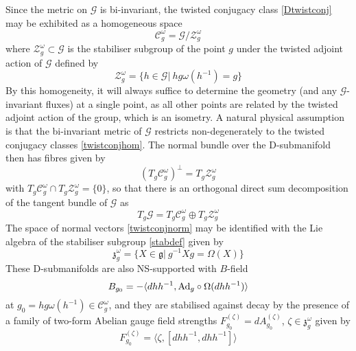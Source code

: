Since the metric on $\mathcal{G}$ is bi-invariant, the twisted conjugacy class
\eqref{Dtwistconj} may be exhibited as a homogeneous space
\begin{equation}
  \label{twistconjhom}
  {\mathcal C}_g^\omega=\mathcal{G}/{\mathcal Z}_g^\omega
\end{equation}
where ${\mathcal Z}_g^\omega\subset \mathcal{G}$ is the stabiliser subgroup of
the point $g$ under the twisted adjoint action of $\mathcal{G}$ defined by
\begin{equation}
  \label{stabdef}
  {\mathcal Z}_g^\omega=\{h\in \mathcal{G} |~hg\omega(h^{-1})=g\}
\end{equation}
By this homogeneity, it will always suffice to determine the geometry (and any
$\mathcal{G}$-invariant fluxes) at a single point, as all other points are
related by the twisted adjoint action of the group, which is an isometry. A
natural physical assumption is that the bi-invariant metric of $\mathcal{G}$
restricts non-degenerately to the twisted conjugacy classes
\eqref{twistconjhom}. The normal bundle over the D-submanifold then has fibres
given by
\begin{equation}
  \label{twistconjnorm}
  (T_g\mathcal{C}_g^\omega)^\perp=T_g\mathcal{Z}_g^\omega
\end{equation}
with $T_g\mathcal{C}_g^\omega\cap T_g\mathcal{Z}_g^\omega=\{0\}$, so that there
is an orthogonal direct sum decomposition of the tangent bundle of $\mathcal{G}$
as
\begin{equation}
  \label{TgGdecomp}
  T_g\mathcal{G}=T_g\mathcal{C}_g^\omega\oplus T_g\mathcal{Z}_g^\omega
\end{equation}
The space of normal vectors \eqref{twistconjnorm} may be identified with the Lie
algebra of the stabiliser subgroup \eqref{stabdef} given by
\begin{equation}
  \label{stabLiealg}
  \mathfrak{z}_g^\omega=\{X\in\mathfrak{g}|~g^{-1}Xg=\Omega(X)\}
\end{equation}
These D-submanifolds are also NS-supported with $B$-field \cite{Stanciu1}
\begin{equation}
  \label{Bfieldg0}
  B_{g_0}=-\langle d hh^{-1},{\rm Ad}_g\circ\Omega(d hh^{-1})\rangle
\end{equation}
at $g_0=hg\omega(h^{-1})\in{\mathcal C}_g^\omega$, and they are stabilised
against decay by the presence of a family of two-form Abelian gauge field
strengths $F_{g_0}^{(\zeta)}= d A_{g_0}^{(\zeta)}$,
$\zeta\in\mathfrak{z}_g^\omega$ given by \cite{BSR1}
\begin{equation}
  \label{2formfamily}
  F_{g_0}^{(\zeta)}=\langle\zeta,[ d hh^{-1}, d hh^{-1}]\rangle
\end{equation}
